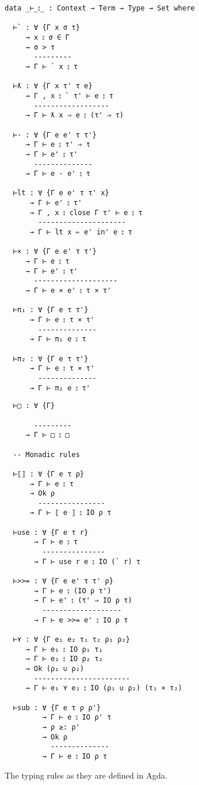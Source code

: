 \begin{listing}
  \begin{multicols}{2}
\begin{verbatim}
data _⊢_⦂_ : Context → Term → Type → Set where

  ⊢` : ∀ {Γ x σ τ}
     → x ⦂ σ ∈ Γ
     → σ > τ
       ---------
     → Γ ⊢ ` x ⦂ τ

  ⊢ƛ : ∀ {Γ x τ' τ e}
     → Γ , x ⦂ ` τ' ⊢ e ⦂ τ
       ------------------
     → Γ ⊢ ƛ x ⇒ e ⦂ (τ' ⇒ τ)

  ⊢· : ∀ {Γ e e' τ τ'}
     → Γ ⊢ e ⦂ τ' ⇒ τ
     → Γ ⊢ e' ⦂ τ'
       --------------
     → Γ ⊢ e · e' ⦂ τ

  ⊢lt : ∀ {Γ e e' τ τ' x}
      → Γ ⊢ e' ⦂ τ'
      → Γ , x ⦂ close Γ τ' ⊢ e ⦂ τ
        ---------------------
      → Γ ⊢ lt x ⇐ e' in' e ⦂ τ

  ⊢× : ∀ {Γ e e' τ τ'}
     → Γ ⊢ e ⦂ τ
     → Γ ⊢ e' ⦂ τ'
       --------------------
     → Γ ⊢ e × e' ⦂ τ × τ'

  ⊢π₁ : ∀ {Γ e τ τ'}
      → Γ ⊢ e ⦂ τ × τ'
        --------------
      → Γ ⊢ π₁ e ⦂ τ

  ⊢π₂ : ∀ {Γ e τ τ'}
      → Γ ⊢ e ⦂ τ × τ'
        --------------
      → Γ ⊢ π₂ e ⦂ τ'
\end{verbatim}
\begin{verbatim}
  ⊢□ : ∀ {Γ}
       
       ---------
     → Γ ⊢ □ ⦂ □

  -- Monadic rules

  ⊢⟦⟧ : ∀ {Γ e τ ρ}
      → Γ ⊢ e ⦂ τ
      → Ok ρ
        ----------------
      → Γ ⊢ ⟦ e ⟧ ⦂ IO ρ τ
      
  ⊢use : ∀ {Γ e τ r}
       → Γ ⊢ e ⦂ τ
         ---------------
       → Γ ⊢ use r e ⦂ IO (` r) τ
  
  ⊢>>= : ∀ {Γ e e' τ τ' ρ}
       → Γ ⊢ e ⦂ (IO ρ τ')
       → Γ ⊢ e' ⦂ (τ' ⇒ IO ρ τ)
         -------------------
       → Γ ⊢ e >>= e' ⦂ IO ρ τ

  ⊢⋎ : ∀ {Γ e₁ e₂ τ₁ τ₂ ρ₁ ρ₂}
     → Γ ⊢ e₁ ⦂ IO ρ₁ τ₁
     → Γ ⊢ e₂ ⦂ IO ρ₂ τ₂
     → Ok (ρ₁ ∪ ρ₂)
       -----------------------
     → Γ ⊢ e₁ ⋎ e₂ ⦂ IO (ρ₁ ∪ ρ₂) (τ₁ × τ₂)

  ⊢sub : ∀ {Γ e τ ρ ρ'}
         → Γ ⊢ e ⦂ IO ρ' τ
         → ρ ≥: ρ'
         → Ok ρ
           --------------
         → Γ ⊢ e ⦂ IO ρ τ
\end{verbatim}
\end{multicols}
\caption{The typing rules as they are defined in Agda.}\label{lst:typingrules}
\end{listing}
